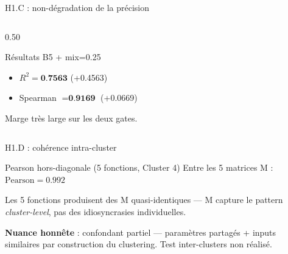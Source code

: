 \documentclass[10pt]{beamer}
\begin{document}
\begin{frame}{H1.C : non-dégradation de la précision}
\begin{columns}
\begin{column}{0.50\textwidth}
      \begin{exampleblock}{Résultats B5 + mix=0.25}
        \footnotesize
        \begin{itemize}
          \item $R^2 = \textbf{0.7563}$ \hfill (\textcolor{success}{+0.4563})
          \item Spearman $= \textbf{0.9169}$ \hfill (\textcolor{success}{+0.0669})
        \end{itemize}
      \end{exampleblock}

      \begin{verdictbox}
        \centering\footnotesize
        Marge très large sur les deux gates.
      \end{verdictbox}
    \end{column}
  \end{columns}
\end{frame}

\begin{frame}{H1.D : cohérence intra-cluster}
  \begin{block}{Pearson hors-diagonale (5 fonctions, Cluster 4)}
    \centering\footnotesize
    Entre les 5 matrices M :
    \quad
    $\displaystyle\boxed{\text{Pearson} = 0.992}$
  \end{block}

  \begin{interpbox}
    \footnotesize
    Les 5 fonctions produisent des M quasi-identiques --- M capture le pattern \emph{cluster-level}, pas des idiosyncrasies individuelles.
  \end{interpbox}

  \vspace{4pt}
  \begin{problembox}
    \centering\footnotesize
    \textbf{Nuance honnête} : confondant partiel --- paramètres partagés + inputs similaires par construction du clustering. Test inter-clusters non réalisé.
  \end{problembox}
\end{frame}
\end{document}
